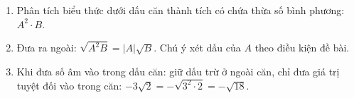 \begin{enumerate}
\item Phân tích biểu thức dưới dấu căn thành tích có chứa thừa số bình phương: $A^2 \cdot B$.
\item Đưa ra ngoài: $\sqrt{A^2 B} = |A|\sqrt{B}$. Chú ý xét dấu của $A$ theo điều kiện đề bài.
\item Khi đưa số âm vào trong dấu căn: giữ dấu trừ ở ngoài căn, chỉ đưa giá trị tuyệt đối vào trong căn: $-3\sqrt{2} = -\sqrt{3^2 \cdot 2} = -\sqrt{18}$.
\end{enumerate}
